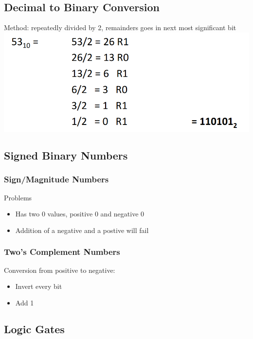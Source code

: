 \documentclass[12pt]{article}
\begin{document}
\subsection{Decimal to Binary Conversion}
Method: repeatedly divided by 2, remainders goes in next most significant bit
\includegraphics[width=\textwidth]{DecimalToBinary.png}
\subsection{Signed Binary Numbers}
\subsubsection{Sign/Magnitude Numbers}
Problems
\begin{itemize}
    \item Has two 0 values, positive 0 and negative 0
    \item Addition of a negative and a postive will fail
\end{itemize}
\subsubsection{Two's Complement Numbers}
Conversion from positive to negative:
\begin{itemize}
    \item Invert every bit
    \item Add 1
\end{itemize}
\subsection{Logic Gates}
\end{document}
